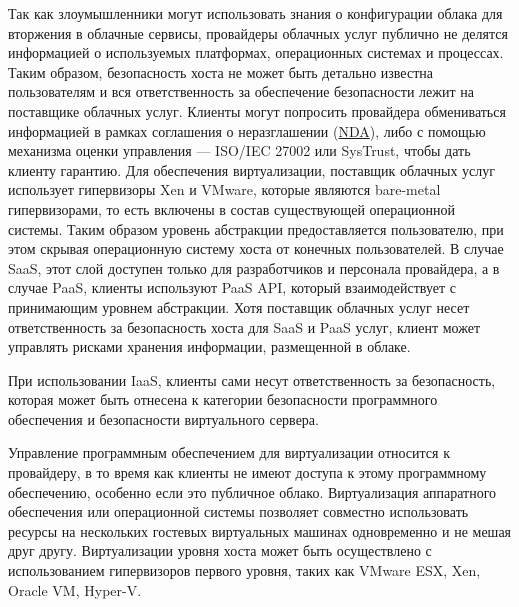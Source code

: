 Так как злоумышленники могут использовать знания о конфигурации облака для вторжения в облачные сервисы, провайдеры облачных услуг публично не делятся информацией о используемых платформах, операционных системах и процессах.
Таким образом, безопасность хоста не может быть детально известна пользователям и вся ответственность за обеспечение безопасности лежит на поставщике облачных услуг.
Клиенты могут попросить провайдера обмениваться информацией в рамках соглашения о неразглашении (\hyperlink{nda}{NDA}), либо с помощью механизма оценки управления --- ISO/IEC 27002 или SysTrust, чтобы дать клиенту гарантию.
Для обеспечения виртуализации, поставщик облачных услуг использует гипервизоры Xen и VMware, которые являются bare-metal гипервизорами, то есть включены в состав существующей операционной системы.
Таким образом уровень абстракции предоставляется пользователю, при этом скрывая операционную систему хоста от конечных пользователей.
В случае SaaS, этот слой доступен только для разработчиков и персонала провайдера, а в случае PaaS, клиенты используют PaaS API, который взаимодействует с принимающим уровнем абстракции.
Хотя поставщик облачных услуг несет ответственность за безопасность хоста для SaaS и PaaS услуг, клиент может управлять рисками хранения информации, размещенной в облаке.

При использовании IaaS, клиенты сами несут ответственность за безопасность, которая может быть отнесена к категории безопасности программного обеспечения и безопасности виртуального сервера.

Управление программным обеспечением для виртуализации относится к провайдеру, в то время как клиенты не имеют доступа к этому программному обеспечению, особенно если это публичное облако.
Виртуализация аппаратного обеспечения или операционной системы позволяет совместно использовать ресурсы на нескольких гостевых виртуальных машинах одновременно и не мешая друг другу.
Виртуализации уровня хоста может быть осуществлено с использованием гипервизоров первого уровня, таких как VMware ESX, Xen, Oracle VM, Hyper-V.

